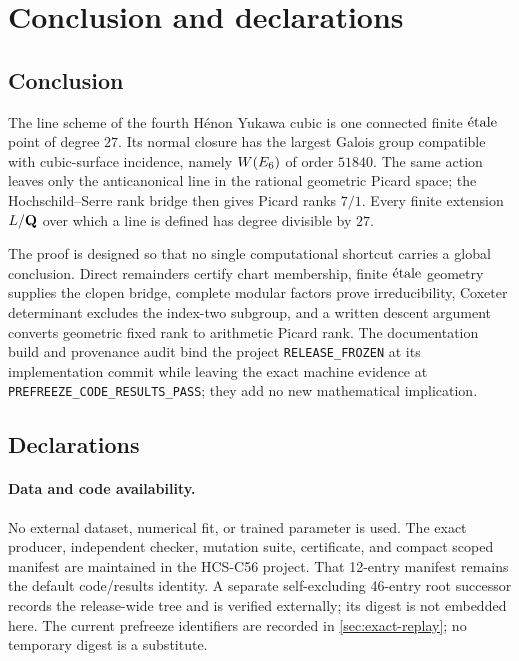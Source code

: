 \section{Conclusion and declarations}
\label{sec:conclusion}

\subsection{Conclusion}

The line scheme of the fourth H\'enon Yukawa cubic is one connected finite
\(\mathrm{\acute{e}tale}\) point of degree \(27\).  Its normal closure has the largest
Galois group compatible with cubic-surface incidence, namely
\(W(E_6)\) of order \(51840\).  The same action leaves only the anticanonical
line in the rational geometric Picard space; the Hochschild--Serre rank
bridge then gives Picard ranks \(7/1\).  Every finite extension \(L/\mathbf Q\)
over which a line is defined has degree divisible by \(27\).

The proof is designed so that no single computational shortcut carries a
global conclusion.  Direct remainders certify chart membership, finite
\(\mathrm{\acute{e}tale}\) geometry supplies the clopen bridge, complete modular factors
prove irreducibility, Coxeter determinant excludes the index-two subgroup,
and a written descent argument converts geometric fixed rank to arithmetic
Picard rank.  The documentation build and provenance audit bind the project
\texttt{RELEASE\_FROZEN} at its implementation commit while leaving the exact
machine evidence at \texttt{PREFREEZE\_CODE\_RESULTS\_PASS}; they add no new
mathematical implication.

\subsection{Declarations}

\paragraph{Data and code availability.}
No external dataset, numerical fit, or trained parameter is used.  The exact
producer, independent checker, mutation suite, certificate, and compact
scoped manifest are maintained in the HCS-C56 project.  That 12-entry manifest
remains the default code/results identity.  A separate self-excluding 46-entry
root successor records the release-wide tree and is verified externally; its
digest is not embedded here.  The current prefreeze identifiers are recorded
in \cref{sec:exact-replay}; no temporary digest is a substitute.

